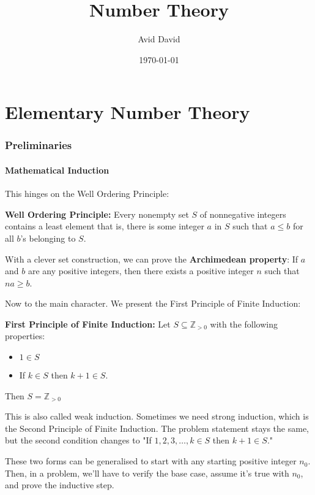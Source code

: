 \documentclass[12pt]{article}
\begin{document}
\title{Number Theory}
\author{Avid David}
\date{\today}
\maketitle
\tableofcontents
\newpage
\part{Elementary Number Theory}
\section{Preliminaries}
\subsection{Mathematical Induction}
This hinges on the Well Ordering Principle:
\begin{concept}
    \textbf{Well Ordering Principle:} Every nonempty set $S$ of nonnegative integers contains a least element that is, there is some integer $a$ in $S$ such that $a \leq b$ for all $b$'s belonging to $S$.
\end{concept}
With a clever set construction, we can prove the \textbf{Archimedean property}: If $a$ and $b$ are any positive integers, then there exists a positive integer $n$ such that $na \geq b$.
\par Now to the main character. We present the First Principle of Finite Induction:
\begin{concept}
    \textbf{First Principle of Finite Induction:} Let $S \subseteq \mathbb{Z}_{>0}$ with the following properties:
    \begin{itemize}
        \item $1 \in S$
        \item If $k \in S$ then $k+1 \in S$.
    \end{itemize}
    Then $S = \mathbb{Z}_{>0}$
\end{concept}
This is also called weak induction. Sometimes we need strong induction, which is the Second Principle of Finite Induction. The problem statement stays the same, but the second condition changes to "If $1,2,3,\ldots,k \in S$ then $k+1 \in S$."
\par These two forms can be generalised to start with any starting positive integer $n_0$. Then, in a problem, we'll have to verify the base case, assume it's true with $n_0$, and prove the inductive step.
\end{document}
